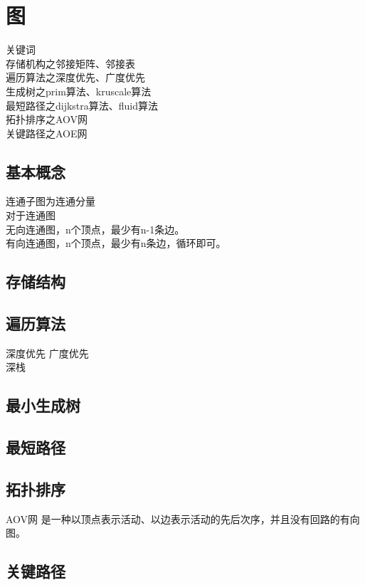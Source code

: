 \chapter{图}

关键词 \\
存储机构之邻接矩阵、邻接表 \\
遍历算法之深度优先、广度优先 \\ 
生成树之prim算法、kruscale算法 \\
最短路径之dijkstra算法、fluid算法 \\
拓扑排序之AOV网 \\
关键路径之AOE网 \\ 

\section{基本概念}
连通子图为连通分量 \\

\noindent 
对于连通图 \\
无向连通图，n个顶点，最少有n-1条边。 \\
有向连通图，n个顶点，最少有n条边，循环即可。 \\

\section{存储结构}

\section{遍历算法}
深度优先 广度优先 \\
深栈 

\section{最小生成树}

\section{最短路径}

\section{拓扑排序}

AOV网
是一种以顶点表示活动、以边表示活动的先后次序，并且没有回路的有向图。

\section{关键路径}

